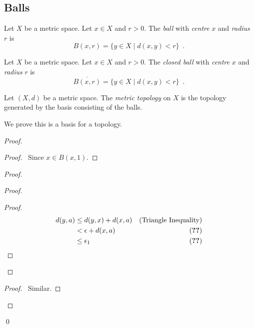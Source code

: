 \subsection{Balls}

\begin{df}[Ball]
Let $X$ be a metric space. Let $x \in X$ and $r > 0$. The \emph{ball} with \emph{centre} $x$ and \emph{radius} $r$ is
\[ B(x,r) = \{ y \in X \mid d(x,y) < r \} \enspace . \]
\end{df}

\begin{df}
Let $X$ be a metric space. Let $x \in X$ and $r > 0$. The \emph{closed ball} with \emph{centre} $x$ and \emph{radius} $r$ is
\[ \overline{B(x,r)} = \{ y \in X \mid d(x,y) < r \} \enspace . \]
\end{df}

\begin{df}
Let $(X,d)$ be a metric space. The \emph{metric topology} on $X$ is the topology generated by the basis consisting of the balls.

We prove this is a basis for a topology.
\end{df}

\begin{proof}
\pf
{}
\begin{proof}
	\pf\ Since $x \in B(x,1)$.
\end{proof}
\begin{proof}
	\begin{proof}
		\begin{proof}
			\pf
			\begin{align*}
				d(y,a) & \leq d(y,x) + d(x,a) & (\text{Triangle Inequality}) \\
				& < \epsilon + d(x,a) & (\text{\stepref{i}}) \\
				& \leq \epsilon_1 & (\text{\stepref{b}})
			\end{align*}
		\end{proof}
	\end{proof}
	\begin{proof}
		\pf\ Similar.
	\end{proof}
\end{proof}
\qed
\end{proof}

